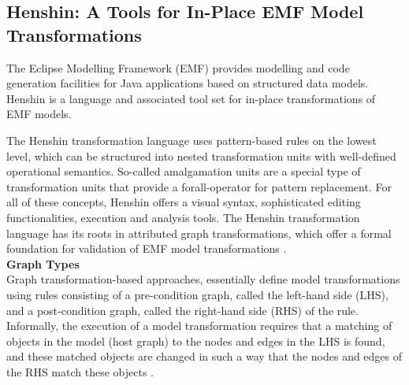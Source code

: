 \subsection{Henshin: A Tools for In-Place EMF Model Transformations}\label{henshin}
The Eclipse Modelling Framework (EMF) provides modelling and code generation facilities for Java applications based on structured data models. Henshin is a language and associated tool set for in-place transformations of EMF models. 

The Henshin transformation language uses pattern-based rules on the lowest level, which can be structured into nested transformation units with well-defined operational semantics. So-called amalgamation units are a special type of transformation units that provide a forall-operator for pattern replacement. For all of these concepts, Henshin offers a visual syntax, sophisticated editing functionalities, execution and analysis tools. The Henshin transformation language has its roots in attributed graph transformations, which offer a formal foundation for validation of EMF model transformations \cite{arendt2010henshin}. \\ 
\textbf{Graph Types}\\ 
Graph transformation-based approaches, essentially define model transformations using rules consisting of a pre-condition graph, called the left-hand side (LHS), and a post-condition graph, called the right-hand side (RHS) of the rule. Informally, the execution of a model transformation requires that a matching of objects in the model (host graph) to the nodes and edges in the LHS is found, and these matched objects are changed in such a way that the nodes and edges of the RHS match these objects \cite{tichy2013detecting}.

